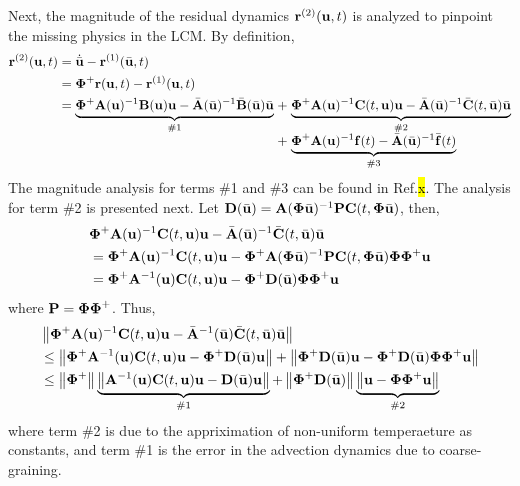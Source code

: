 Next, the magnitude of the residual dynamics $\mathbf{r}^{(2)}(\mathbf{u},t)$ is analyzed to pinpoint the missing physics in the LCM. By definition,
\begin{subequations}
\begin{align}
    \vr^{(2)}(\vu,t) &= \dot{\bvu} - \vr^{(1)}(\bvu,t) \\ 
    &= \vPhiplus\vr(\vu,t) - \vr^{(1)}(\vu,t)\\
    &= \begin{array}[t]{@{}l@{\;}c@{\;}l@{}}
       \underbrace{\vPhiplus\vA(\vu)^{-1}\vB(\vu)\vu - \bvA(\bvu)^{-1}\bvB(\bvu)\bvu}_{\text{\#1}}
       & + &
       \underbrace{\vPhiplus\vA(\vu)^{-1}\vC(t,\vu)\vu - \bvA(\bvu)^{-1}\bvC(t,\bvu)\bvu}_{\text{\#2}} \\
       & + &
       \underbrace{\vPhiplus\vA(\vu)^{-1}\vf(t) - \bvA(\bvu)^{-1}\bvf(t)}_{\text{\#3}}
       \end{array}
\end{align}
\end{subequations}
The magnitude analysis for terms \#1 and \#3 can be found in Ref.\hl{x}. The analysis for term \#2 is presented next. Let $\mathbf{D}(\bar{\mathbf{u}}) = \mathbf{A}(\boldsymbol{\Phi}\bar{\mathbf{u}})^{-1}\mathbf{P}\mathbf{C}(t,\boldsymbol{\Phi}\bar{\mathbf{u}})$, then,
\begin{subequations}
    \begin{align}
        &\boldsymbol{\Phi}^{+}\mathbf{A}(\mathbf{u})^{-1}\mathbf{C}(t,\mathbf{u})\mathbf{u} - \bar{\mathbf{A}}(\bar{\mathbf{u}})^{-1}\bar{\mathbf{C}}(t,\bar{\mathbf{u}})\bar{\mathbf{u}}\\
        &= \boldsymbol{\Phi}^{+}\mathbf{A}(\mathbf{u})^{-1}\mathbf{C}(t,\mathbf{u})\mathbf{u} - \boldsymbol{\Phi}^{+}\mathbf{A}(\boldsymbol{\Phi}\bar{\mathbf{u}})^{-1}\mathbf{P}\mathbf{C}(t,\boldsymbol{\Phi}\bar{\mathbf{u}})\boldsymbol{\Phi}\boldsymbol{\Phi}^{+}\mathbf{u}\\
        &= \boldsymbol{\Phi}^{+}\mathbf{A}^{-1}(\mathbf{u})\mathbf{C}(t,\mathbf{u})\mathbf{u} - \boldsymbol{\Phi}^{+}\mathbf{D}(\bar{\mathbf{u}})\boldsymbol{\Phi}\boldsymbol{\Phi}^{+}\mathbf{u}\\
    \end{align}
\end{subequations}
where $\mathbf{P}=\boldsymbol{\Phi}\boldsymbol{\Phi}^{+}$. Thus,
\begin{subequations}
    \begin{align}
        &\left\|\boldsymbol{\Phi}^{+}\mathbf{A}(\mathbf{u})^{-1}\mathbf{C}(t,\mathbf{u})\mathbf{u} - \bar{\mathbf{A}}^{-1}(\bar{\mathbf{u}})\bar{\mathbf{C}}(t,\bar{\mathbf{u}})\bar{\mathbf{u}}\right\| \\
        &\leq \left\|\boldsymbol{\Phi}^{+}\mathbf{A}^{-1}(\mathbf{u})\mathbf{C}(t,\mathbf{u})\mathbf{u} - \boldsymbol{\Phi}^{+}\mathbf{D}(\bar{\mathbf{u}})\mathbf{u}\right\| + \left\|\boldsymbol{\Phi}^{+}\mathbf{D}(\bar{\mathbf{u}})\mathbf{u} - \boldsymbol{\Phi}^{+}\mathbf{D}(\bar{\mathbf{u}})\boldsymbol{\Phi}\boldsymbol{\Phi}^{+}\mathbf{u}\right\|\\
        &\leq \left\|\boldsymbol{\Phi}^{+}\right\|\underbrace{\left\|\mathbf{A}^{-1}(\mathbf{u})\mathbf{C}(t,\mathbf{u})\mathbf{u} - \mathbf{D}(\bar{\mathbf{u}})\mathbf{u}\right\|}_{\#1} + \left\|\boldsymbol{\Phi}^{+}\mathbf{D}(\bar{\mathbf{u}})\right\|\underbrace{\left\|\mathbf{u} - \boldsymbol{\Phi}\boldsymbol{\Phi}^{+}\mathbf{u}\right\|}_{\#2}
    \end{align}
\end{subequations}
where term \#2 is due to the appriximation of non-uniform temperaeture as constants, and term \#1 is the error in the advection dynamics due to coarse-graining. 

